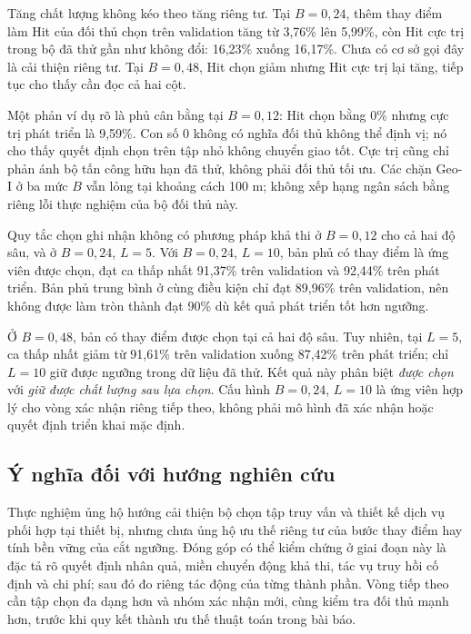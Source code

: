Tăng chất lượng không kéo theo tăng riêng tư. Tại $B=0{,}24$, thêm thay điểm làm Hit của đối thủ chọn trên validation tăng từ 3,76\% lên 5,99\%, còn Hit cực trị trong bộ đã thử gần như không đổi: 16,23\% xuống 16,17\%. Chưa có cơ sở gọi đây là cải thiện riêng tư. Tại $B=0{,}48$, Hit chọn giảm nhưng Hit cực trị lại tăng, tiếp tục cho thấy cần đọc cả hai cột.

Một phản ví dụ rõ là phủ cân bằng tại $B=0{,}12$: Hit chọn bằng 0\% nhưng cực trị phát triển là 9,59\%. Con số 0 không có nghĩa đối thủ không thể định vị; nó cho thấy quyết định chọn trên tập nhỏ không chuyển giao tốt. Cực trị cũng chỉ phản ánh bộ tấn công hữu hạn đã thử, không phải đối thủ tối ưu. Các chặn Geo-I ở ba mức $B$ vẫn lỏng tại khoảng cách 100 m; không xếp hạng ngân sách bằng riêng lỗi thực nghiệm của bộ đối thủ này.

Quy tắc chọn ghi nhận không có phương pháp khả thi ở $B=0{,}12$ cho cả hai độ sâu, và ở $B=0{,}24$, $L=5$. Với $B=0{,}24$, $L=10$, bản phủ có thay điểm là ứng viên được chọn, đạt ca thấp nhất 91,37\% trên validation và 92,44\% trên phát triển. Bản phủ trung bình ở cùng điều kiện chỉ đạt 89,96\% trên validation, nên không được làm tròn thành đạt 90\% dù kết quả phát triển tốt hơn ngưỡng.

Ở $B=0{,}48$, bản có thay điểm được chọn tại cả hai độ sâu. Tuy nhiên, tại $L=5$, ca thấp nhất giảm từ 91,61\% trên validation xuống 87,42\% trên phát triển; chỉ $L=10$ giữ được ngưỡng trong dữ liệu đã thử. Kết quả này phân biệt \emph{được chọn} với \emph{giữ được chất lượng sau lựa chọn}. Cấu hình $B=0{,}24$, $L=10$ là ứng viên hợp lý cho vòng xác nhận riêng tiếp theo, không phải mô hình đã xác nhận hoặc quyết định triển khai mặc định.

\subsection{Ý nghĩa đối với hướng nghiên cứu}

Thực nghiệm ủng hộ hướng cải thiện bộ chọn tập truy vấn và thiết kế dịch vụ phối hợp tại thiết bị, nhưng chưa ủng hộ ưu thế riêng tư của bước thay điểm hay tính bền vững của cắt ngưỡng. Đóng góp có thể kiểm chứng ở giai đoạn này là đặc tả rõ quyết định nhân quả, miền chuyển động khả thi, tác vụ truy hồi cố định và chi phí; sau đó đo riêng tác động của từng thành phần. Vòng tiếp theo cần tập chọn đa dạng hơn và nhóm xác nhận mới, cùng kiểm tra đối thủ mạnh hơn, trước khi quy kết thành ưu thế thuật toán trong bài báo.
